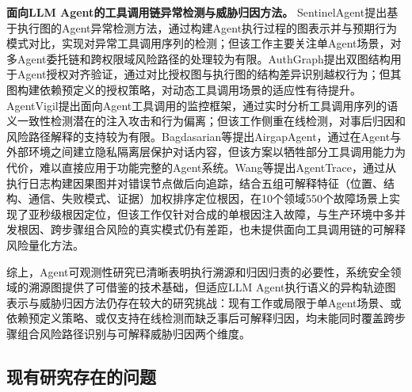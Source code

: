 \textbf{面向LLM Agent的工具调用链异常检测与威胁归因方法。}
SentinelAgent\cite{he2025sentinelagent}提出基于执行图的Agent异常检测方法，通过构建Agent执行过程的图表示并与预期行为模式对比，实现对异常工具调用序列的检测；但该工作主要关注单Agent场景，对多Agent委托链和跨权限域风险路径的处理较为有限。AuthGraph\cite{wang2026aligning}提出双图结构用于Agent授权对齐验证，通过对比授权图与执行图的结构差异识别越权行为；但其图构建依赖预定义的授权策略，对动态工具调用场景的适应性有待提升。AgentVigil\cite{wang2025agentvigil}提出面向Agent工具调用的监控框架，通过实时分析工具调用序列的语义一致性检测潜在的注入攻击和行为偏离；但该工作侧重在线检测，对事后归因和风险路径解释的支持较为有限。Bagdasarian等\cite{bagdasarian2024airgapagent}提出AirgapAgent，通过在Agent与外部环境之间建立隐私隔离层保护对话内容，但该方案以牺牲部分工具调用能力为代价，难以直接应用于功能完整的Agent系统。Wang等\cite{wang2026agenttrace}提出AgentTrace，通过从执行日志构建因果图并对错误节点做后向追踪，结合五组可解释特征（位置、结构、通信、失败模式、证据）加权排序定位根因，在10个领域550个故障场景上实现了亚秒级根因定位，但该工作仅针对合成的单根因注入故障，与生产环境中多并发根因、跨步骤组合风险的真实模式仍有差距，也未提供面向工具调用链的可解释风险量化方法。

综上，Agent可观测性研究已清晰表明执行溯源和归因归责的必要性，系统安全领域的溯源图提供了可借鉴的技术基础，但适应LLM Agent执行语义的异构轨迹图表示与威胁归因方法仍存在较大的研究挑战：现有工作或局限于单Agent场景、或依赖预定义策略、或仅支持在线检测而缺乏事后可解释归因，均未能同时覆盖跨步骤组合风险路径识别与可解释威胁归因两个维度。

\subsection{现有研究存在的问题}

